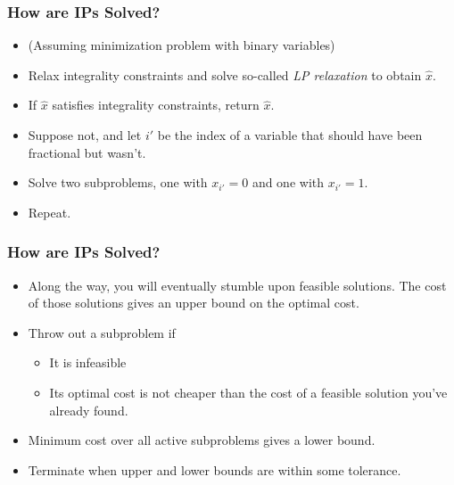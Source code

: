 \documentclass[12pt,handout]{beamer}
\begin{document}
\begin{frame}
\frametitle{How are IPs Solved?}
\begin{itemize}
\item (Assuming minimization problem with binary variables)
\item Relax integrality constraints and solve so-called {\em LP relaxation} to obtain $\hat{x}$.
\item If $\hat{x}$ satisfies integrality constraints, return $\hat{x}$.
\item Suppose not, and let $i'$ be the index of a variable that should have been fractional but wasn't.
\item Solve two subproblems, one with $x_{i'} = 0$ and one with $x_{i'} = 1$.
\item Repeat.
\end{itemize}
\end{frame}

\begin{frame}
\frametitle{How are IPs Solved?}
\begin{itemize}
\item Along the way, you will eventually stumble upon feasible solutions. The cost of those solutions gives an upper bound on the optimal cost.
\item Throw out a subproblem if
    \begin{itemize}
    \item It is infeasible
    \item Its optimal cost is not cheaper than the cost of a feasible solution you've already found.
    \end{itemize}
\item Minimum cost over all active subproblems gives a lower bound.
\item Terminate when upper and lower bounds are within some tolerance.
\end{itemize}
\end{frame}
\end{document}
